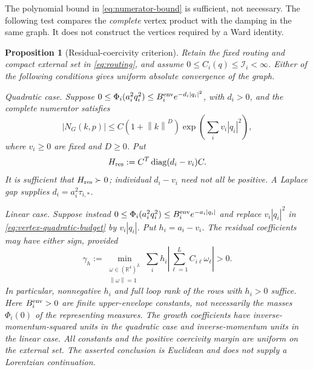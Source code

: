 \documentclass[final,5p,times,twocolumn,numbers,nopreprintline]{elsarticle}
\numberwithin{equation}{section}
\newtheorem{proposition}[theorem]{Proposition}
\theoremstyle{definition}
\theoremstyle{remark}
\newcommand{\Ph}{\Phi}
\newcommand{\diag}{\operatorname{diag}}
\newcommand{\RR}{\mathbb R}
\newcommand{\norm}[1]{\left\lVert #1\right\rVert}
\begin{document}
The polynomial bound in \eqref{eq:numerator-bound} is sufficient,
not necessary. The following test compares the \emph{complete}
vertex product with the damping in the same graph. It does not
construct the vertices required by a Ward identity.

\begin{proposition}[Residual-coercivity criterion]
\label{prop:residual-coercivity}
Retain the fixed routing and compact external set in
\eqref{eq:routing}, and assume \(0\leq C_i(q)\leq\mathcal I_i<\infty\).
Either of the following conditions gives uniform absolute convergence
of the graph.

\textit{Quadratic case.} Suppose
\(0\leq\Ph_i(a_i^2q_i^2)\leq B_i^{\rm env}e^{-d_i|q_i|^2}\), with
\(d_i>0\), and the complete numerator satisfies
\begin{equation}
 |N_G(k,p)|\leq C(1+\norm{k}^D)
            \exp\!\left(\sum_i v_i|q_i|^2\right),
 \label{eq:vertex-quadratic-budget}
\end{equation}
where \(v_i\geq0\) are fixed and \(D\geq0\). Put
\begin{equation}
 H_{\rm res}:=C^T\diag(d_i-v_i)C.
 \label{eq:residual-Gram-matrix}
\end{equation}
It is sufficient that \(H_{\rm res}\succ0\); individual
\(d_i-v_i\) need not all be positive. A Laplace gap supplies
\(d_i=a_i^2\tau_{i,*}\).

\textit{Linear case.} Suppose instead
\(0\leq\Ph_i(a_i^2q_i^2)\leq B_i^{\rm env}e^{-a_i|q_i|}\) and replace
\(v_i|q_i|^2\) in \eqref{eq:vertex-quadratic-budget} by
\(v_i|q_i|\). Put \(h_i=a_i-v_i\). The residual coefficients may
have either sign, provided
\begin{equation}
 \gamma_h:=\min_{\substack{\omega\in(\RR^4)^L\\\norm{\omega}=1}}
     \sum_i h_i\left|\sum_{\ell=1}^L C_{i\ell}\omega_\ell\right|>0.
 \label{eq:signed-linear-coercivity}
\end{equation}
In particular, nonnegative \(h_i\) and full loop rank of the rows
with \(h_i>0\) suffice. Here \(B_i^{\rm env}>0\) are finite
upper-envelope constants, not necessarily the masses \(\Ph_i(0)\)
of the representing measures. The growth coefficients have
inverse-momentum-squared units in the quadratic case and
inverse-momentum units in the linear case.
All constants and the positive coercivity margin are uniform on the
external set. The asserted conclusion is Euclidean and does not
supply a Lorentzian continuation.
\end{proposition}
\end{document}
